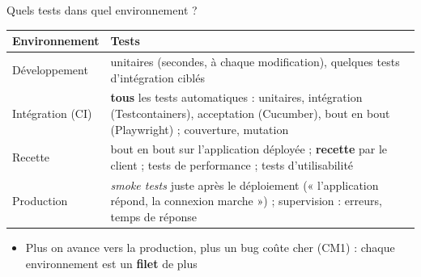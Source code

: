 \documentclass[aspectratio=169,10pt]{beamer}
\begin{document}
\begin{frame}{Quels tests dans quel environnement ?}
  \small
  \begin{datacard}
    \begin{tabular}{@{}p{2.4cm}p{10.2cm}@{}}
      \toprule
      \textbf{Environnement} & \textbf{Tests} \\
      \midrule
      Développement & unitaires (secondes, à chaque modification), quelques tests d'intégration ciblés \\[0.5mm]
      Intégration (CI) & \textbf{tous} les tests automatiques : unitaires, intégration (Testcontainers), acceptation (Cucumber), bout en bout (Playwright) ; couverture, mutation \\[0.5mm]
      Recette & bout en bout sur l'application déployée ; \textbf{recette} par le client ; tests de performance ; tests d'utilisabilité \\[0.5mm]
      Production & \textit{smoke tests} juste après le déploiement (« l'application répond, la connexion marche ») ; supervision : erreurs, temps de réponse \\
      \bottomrule
    \end{tabular}
  \end{datacard}
  \vspace{2mm}
  \begin{itemize}
    \item Plus on avance vers la production, plus un bug coûte cher (CM1) : chaque environnement est un \textbf{filet} de plus
  \end{itemize}
\end{frame}
\end{document}
